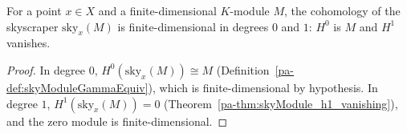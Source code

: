 \begin{theorem}
  \label{pa-thm:moduleFinite_skyModule}
  \leanok

  For a point \(x \in X\) and a finite-dimensional \(K\)-module \(M\), the cohomology of the
  skyscraper \(\mathrm{sky}_x(M)\) is finite-dimensional in degrees \(0\) and \(1\):
  \(H^0\) is \(M\) and \(H^1\) vanishes.
\end{theorem}
\begin{proof}
  \leanok
  In degree \(0\), \(H^0(\mathrm{sky}_x(M)) \cong M\) (Definition~\ref{pa-def:skyModuleGammaEquiv}),
  which is finite-dimensional by hypothesis. In degree \(1\),
  \(H^1(\mathrm{sky}_x(M)) = 0\) (Theorem~\ref{pa-thm:skyModule_h1_vanishing}), and the zero module
  is finite-dimensional.
\end{proof}


